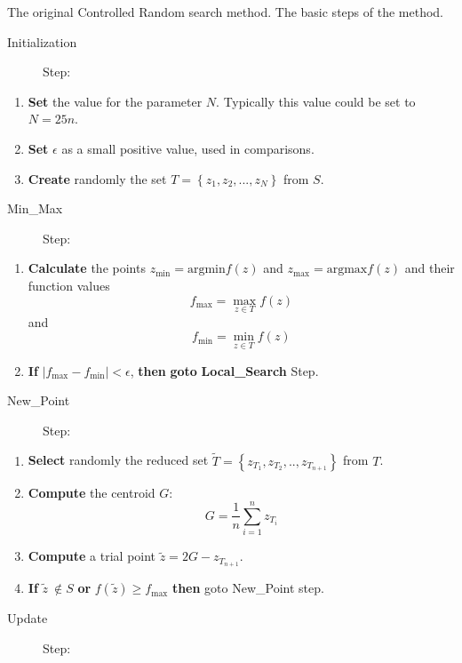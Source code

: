 \documentclass[symmetry,article,submit,moreauthors,pdftex]{Definitions/mdpi}
\begin{document}
\begin{algorithm}
\caption{The original Controlled Random search method. The basic steps of the method.\label{alg:The-Controlled-Random}}

\begin{description}
\item [{Initialization}] Step:
\end{description}
\begin{enumerate}
\item \textbf{Set} the value for the parameter $N$. Typically this value could be set to  $N=25n$.
\item \textbf{Set}  $\epsilon$ as a small positive value, used in comparisons.
\item \textbf{Create} randomly  the set $T=\left\{ z_{1},z_{2},...,z_{N}\right\} $ from $S$.
\end{enumerate}
\begin{description}
\item [{Min\_Max}] Step:
\end{description}
\begin{enumerate}
\item \textbf{Calculate} the points $z_{\mbox{min}}=\mbox{argmin}f(z)$
and $z_{\mbox{max}}=\mbox{argmax}f(z)$ and their function values
\[
f_{\mbox{max}}=\max_{z\in T}f(z)
\]
 and 
\[
f_{\mbox{min}}=\min_{z\in T}f(z)
\]
\item \textbf{If} $\left|f_{\mbox{max}}-f_{\mbox{min}}\right|<\epsilon$,
\textbf{then} \textbf{goto} \textbf{Local\_Search} Step.
\end{enumerate}
\begin{description}
\item [{New\_Point}] Step:
\end{description}
\begin{enumerate}
\item \textbf{Select} randomly the reduced set $\tilde{T}=\left\{ z_{T_{1}},z_{T_{2}},..,z_{T_{n+1}}\right\} $
from $T$.
\item \textbf{Compute} the centroid $G$: 
\[
G=\frac{1}{n}\sum_{i=1}^{n}z_{T_{i}}
\]
\item \textbf{Compute} a trial point $\tilde{z}=2G-z_{T_{n+1}}$.
\item \textbf{If} $\tilde{z}\ \notin S$ \textbf{or} $f(\tilde{z})\ge f_{\mbox{max}}$
\textbf{then} goto New\_Point step. 
\end{enumerate}
\begin{description}
\item [{Update}] Step:

\end{description}
\end{algorithm}
\end{document}
